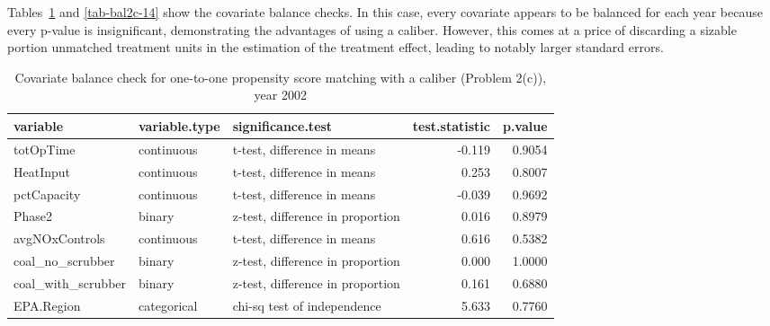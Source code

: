 \begin{enumerate}[(a)]
  Tables~\ref{tab-bal2c-02} and \ref{tab-bal2c-14} show the covariate
  balance checks.  In this case, every covariate appears to be
  balanced for each year because every p-value is insignificant,
  demonstrating the advantages of using a caliber.  However, this
  comes at a price of discarding a sizable portion unmatched treatment
  units in the estimation of the treatment effect, leading to notably
  larger standard errors.

  


  \begin{table}[ht]
    \centering
    \begin{tabular}{lllrr}
      \toprule
      variable & variable.type & significance.test & test.statistic & p.value \\ 
      \midrule
      totOpTime & continuous & t-test, difference in means & -0.119 & 0.9054 \\ 
      HeatInput & continuous & t-test, difference in means & 0.253 & 0.8007 \\ 
      pctCapacity & continuous & t-test, difference in means & -0.039 & 0.9692 \\ 
      Phase2 & binary & z-test, difference in proportion & 0.016 & 0.8979 \\ 
      avgNOxControls & continuous & t-test, difference in means & 0.616 & 0.5382 \\ 
      coal\_no\_scrubber & binary & z-test, difference in proportion & 0.000 & 1.0000 \\ 
      coal\_with\_scrubber & binary & z-test, difference in proportion & 0.161 & 0.6880 \\ 
      EPA.Region & categorical & chi-sq test of independence & 5.633 & 0.7760 \\ 
      \bottomrule
    \end{tabular}
    \caption{Covariate balance check for one-to-one propensity score matching with a caliber (Problem 2(c)), year 2002} 
    \label{tab-bal2c-02}
  \end{table}


\end{enumerate}
